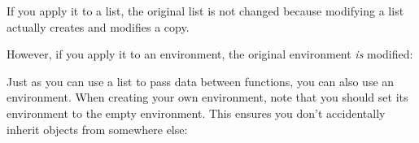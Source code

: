 \begin{Shaded}
\begin{Highlighting}[]
\StringTok{ }
  \StringTok{ }
  \NormalTok{()}
\NormalTok{\}}
\end{Highlighting}
\end{Shaded}

If you apply it to a list, the original list is not changed because
modifying a list actually creates and modifies a copy.

\begin{Shaded}
\begin{Highlighting}[]
\StringTok{ }\NormalTok{()}
\StringTok{ }
\end{Highlighting}
\end{Shaded}

However, if you apply it to an environment, the original environment
\emph{is} modified:

\begin{Shaded}
\begin{Highlighting}[]
\StringTok{ }\NormalTok{()}
\StringTok{ }
\end{Highlighting}
\end{Shaded}

Just as you can use a list to pass data between functions, you can also
use an environment. When creating your own environment, note that you
should set its environment to the empty environment. This ensures you
don't accidentally inherit objects from somewhere else:

\begin{Shaded}
\begin{Highlighting}[]
\StringTok{ }
\StringTok{ }\NormalTok{()}
\NormalTok{(}\NormalTok{, } 

\StringTok{ }\NormalTok{(} \NormalTok{())}
\NormalTok{(}\NormalTok{, } 
\end{Highlighting}
\end{Shaded}

